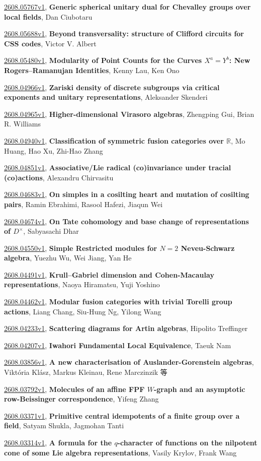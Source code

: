 \documentclass[9pt, a4paper]{article}
\theoremstyle{plain}
\theoremstyle{definition}
\theoremstyle{remark}
\newcommand{\arxiv}[3]{\href{https://arxiv.org/abs/#1}{#1}, \textbf{\textcolor{arxivblue}{#2}}, #3}
\begin{document}
\arxiv{2608.05767v1}{Generic spherical unitary dual for Chevalley groups over local fields}{Dan Ciubotaru}

\arxiv{2608.05688v1}{Beyond transversality: structure of Clifford circuits for CSS codes}{Victor V. Albert}

\arxiv{2608.05480v1}{Modularity of Point Counts for the Curves $X^a=Y^b$: New Rogers--Ramanujan Identities}{Kenny Lau, Ken Ono}

\arxiv{2608.04966v1}{Zariski density of discrete subgroups via critical exponents and unitary representations}{Aleksander Skenderi}

\arxiv{2608.04965v1}{Higher-dimensional Virasoro algebras}{Zhengping Gui, Brian R. Williams}

\arxiv{2608.04940v1}{Classification of symmetric fusion categories over $\mathbb{R}$}{Mo Huang, Hao Xu, Zhi-Hao Zhang}

\arxiv{2608.04851v1}{Associative/Lie radical (co)invariance under tracial (co)actions}{Alexandru Chirvasitu}

\arxiv{2608.04683v1}{On simples in a cosilting heart and mutation of cosilting pairs}{Ramin Ebrahimi, Rasool Hafezi, Jiaqun Wei}

\arxiv{2608.04674v1}{On Tate cohomology and base change of representations of $D^\times$}{Sabyasachi Dhar}

\arxiv{2608.04550v1}{Simple Restricted modules for $N=2$ Neveu-Schwarz algebra}{Yuezhu Wu, Wei Jiang, Yan He}

\arxiv{2608.04491v1}{Krull--Gabriel dimension and Cohen-Macaulay representations}{Naoya Hiramatsu, Yuji Yoshino}

\arxiv{2608.04462v1}{Modular fusion categories with trivial Torelli group actions}{Liang Chang, Siu-Hung Ng, Yilong Wang}

\arxiv{2608.04233v1}{Scattering diagrams for Artin algebras}{Hipolito Treffinger}

\arxiv{2608.04207v1}{Iwahori Fundamental Local Equivalence}{Taeuk Nam}

\arxiv{2608.03856v1}{A new characterisation of Auslander-Gorenstein algebras}{Viktória Klász, Markus Kleinau, Rene Marczinzik 等}

\arxiv{2608.03792v1}{Molecules of an affine FPF $W$-graph and an asymptotic row-Beissinger correspondence}{Yifeng Zhang}

\arxiv{2608.03371v1}{Primitive central idempotents of a finite group over a field}{Satyam Shukla, Jagmohan Tanti}

\arxiv{2608.03314v1}{A formula for the $q$-character of functions on the nilpotent cone of some Lie algebra representations}{Vasily Krylov, Frank Wang}
\end{document}
